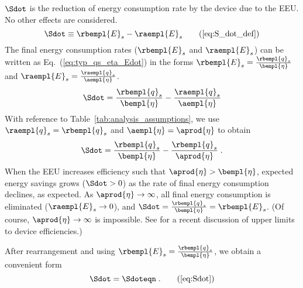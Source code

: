 $\Sdot$ is the reduction of energy consumption rate
by the device due to the EEU.
No other effects are considered.
%
\begin{equation}
  \Sdot \equiv \rbempl{E}_s - \raempl{E}_s  \tag{\ref{eq:S_dot_def}}
\end{equation}
%
The final energy consumption rates ($\rbempl{E}_s$ and $\raempl{E}_s$) 
can be written as Eq.~(\ref{eq:typ_qs_eta_Edot}) in the forms
$\rbempl{E}_s = \frac{\rbempl{q}_s}{\bempl{\eta}}$ and 
$\raempl{E}_s = \frac{\raempl{q}_s}{\aempl{\eta}}$. 
%
\begin{equation}
  \Sdot = \frac{\rbempl{q}_s}{\bempl{\eta}} - \frac{\raempl{q}_s}{\aempl{\eta}}
\end{equation}
%
With reference to Table~\ref{tab:analysis_assumptions}, 
we use $\raempl{q}_s = \rbempl{q}_s$ and $\aempl{\eta} = \aprod{\eta}$ to obtain
%
\begin{equation}
  \Sdot = \frac{\rbempl{q}_s}{\bempl{\eta}} - \frac{\rbempl{q}_s}{\aprod{\eta}} \; .
\end{equation}
%
When the EEU increases efficiency such that $\aprod{\eta} > \bempl{\eta}$,
expected energy savings grows ($\Sdot > 0$)
as the rate of final energy consumption declines,
as expected.
As $\aprod{\eta} \rightarrow \infty$,
all final energy consumption is eliminated ($\raempl{E}_s \rightarrow 0$), and
$\Sdot = \frac{\rbempl{q}_s}{\bempl{\eta}} = \rbempl{E}_s$.
(Of course, $\aprod{\eta} \rightarrow \infty$ is impossible. 
See \citet{Paoli:2020aa} for a recent discussion of upper limits to device efficiencies.)

After rearrangement and using $\rbempl{E}_s = \frac{\rbempl{q}_s}{\bempl{\eta}}$, 
we obtain a convenient form
%
\begin{equation}
  \Sdot = \Sdoteqn \; .  \tag{\ref{eq:Sdot}}
\end{equation}


% 
% 


